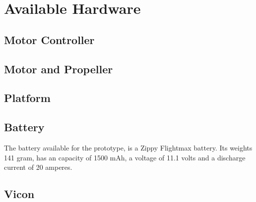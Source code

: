 \section{Available Hardware}

\subsection{Motor Controller}



\subsection{Motor and Propeller}

\subsection{Platform}

\subsection{Battery}
The battery available for the prototype, is a Zippy Flightmax battery. Its weights 141 gram, has an capacity of 1500 mAh, a voltage of 11.1 volts and a discharge current of 20 amperes. 

\subsection{Vicon}


